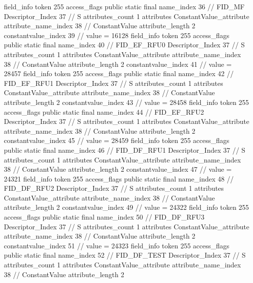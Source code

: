 {{{{			field_info {
				token	255
				access_flags	public static final
				name_index	36		// FID_MF
				Descriptor_Index	37		// S
				attributes_count	1
				attributes {
				ConstantValue_attribute {
					attribute_name_index	38		// ConstantValue
					attribute_length	2
					constantvalue_index	39		// value = 16128
				}
				}
			}
			field_info {
				token	255
				access_flags	public static final
				name_index	40		// FID_EF_RFU0
				Descriptor_Index	37		// S
				attributes_count	1
				attributes {
				ConstantValue_attribute {
					attribute_name_index	38		// ConstantValue
					attribute_length	2
					constantvalue_index	41		// value = 28457
				}
				}
			}
			field_info {
				token	255
				access_flags	public static final
				name_index	42		// FID_EF_RFU1
				Descriptor_Index	37		// S
				attributes_count	1
				attributes {
				ConstantValue_attribute {
					attribute_name_index	38		// ConstantValue
					attribute_length	2
					constantvalue_index	43		// value = 28458
				}
				}
			}
			field_info {
				token	255
				access_flags	public static final
				name_index	44		// FID_EF_RFU2
				Descriptor_Index	37		// S
				attributes_count	1
				attributes {
				ConstantValue_attribute {
					attribute_name_index	38		// ConstantValue
					attribute_length	2
					constantvalue_index	45		// value = 28459
				}
				}
			}
			field_info {
				token	255
				access_flags	public static final
				name_index	46		// FID_DF_RFU1
				Descriptor_Index	37		// S
				attributes_count	1
				attributes {
				ConstantValue_attribute {
					attribute_name_index	38		// ConstantValue
					attribute_length	2
					constantvalue_index	47		// value = 24321
				}
				}
			}
			field_info {
				token	255
				access_flags	public static final
				name_index	48		// FID_DF_RFU2
				Descriptor_Index	37		// S
				attributes_count	1
				attributes {
				ConstantValue_attribute {
					attribute_name_index	38		// ConstantValue
					attribute_length	2
					constantvalue_index	49		// value = 24322
				}
				}
			}
			field_info {
				token	255
				access_flags	public static final
				name_index	50		// FID_DF_RFU3
				Descriptor_Index	37		// S
				attributes_count	1
				attributes {
				ConstantValue_attribute {
					attribute_name_index	38		// ConstantValue
					attribute_length	2
					constantvalue_index	51		// value = 24323
				}
				}
			}
			field_info {
				token	255
				access_flags	public static final
				name_index	52		// FID_DF_TEST
				Descriptor_Index	37		// S
				attributes_count	1
				attributes {
				ConstantValue_attribute {
					attribute_name_index	38		// ConstantValue
					attribute_length	2
}}}}}}}
